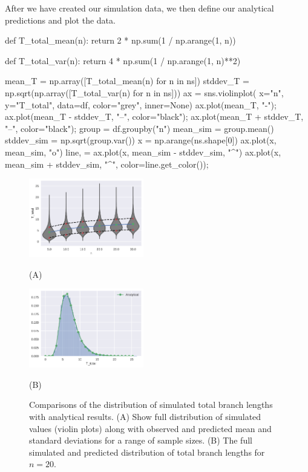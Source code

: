 \documentclass[graybox]{svmult}
\begin{document}
After we have created our simulation data, we then define our analytical
predictions and plot the data.

\begin{pythoncode}
def T_total_mean(n):
    return 2 * np.sum(1 / np.arange(1, n))

def T_total_var(n):
    return 4 * np.sum(1 / np.arange(1, n)**2)

mean_T = np.array([T_total_mean(n) for n in ns])
stddev_T = np.sqrt(np.array([T_total_var(n) for n in ns]))
ax = sns.violinplot(
    x="n", y="T_total", data=df, color="grey", inner=None)
ax.plot(mean_T, "-");
ax.plot(mean_T - stddev_T, "--", color="black");
ax.plot(mean_T + stddev_T, "--", color="black");
group = df.groupby("n")
mean_sim = group.mean()
stddev_sim = np.sqrt(group.var())
x = np.arange(ns.shape[0])
ax.plot(x, mean_sim, "o")
line, = ax.plot(x, mean_sim - stddev_sim, "^")
ax.plot(x, mean_sim + stddev_sim, "^", color=line.get_color());
\end{pythoncode}

\begin{figure}
\begin{center}
    \parbox{5cm}{
    \includegraphics[width=5cm]{images/segsites-example_5_0.pdf}
    \begin{center}(A)\end{center}
    }%
    \qquad
    \parbox{5cm}{
    \includegraphics[width=5cm]{images/segsites-example_7_0.pdf}
    \begin{center}(B)\end{center}
    }
    \caption{Comparisons of the distribution of simulated total branch lengths
        with analytical results. (A) Show full distribution of simulated
        values (violin plots) along with observed and predicted mean and
        standard deviations for a range of sample sizes. (B) The full
        simulated and predicted distribution of total branch lengths
        for $n = 20$.}
    \label{fig:segsites-norecomb}
\end{center}
\end{figure}
\end{document}
